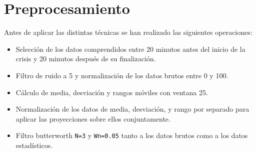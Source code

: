 \documentclass[a4paper,12pt,twoside,oldfontcommands]{memoir}
\begin{document}
\section{Preprocesamiento}
Antes de aplicar las distintas técnicas se han realizado las siguientes operaciones: 
\begin{itemize}
    \item Selección de los datos comprendidos entre 20 minutos antes del inicio de la crisis y 20 minutos después de su finalización. 
    \item Filtro de ruido a 5 y normalización de los datos brutos entre 0 y 100.
    \item Cálculo de media, desviación y rangos móviles con ventana 25. 
    \item Normalización de los datos de media, desviación, y rango por separado para aplicar las proyecciones sobre ellos conjuntamente. 
    \item Filtro butterworth \texttt{N=3} y \texttt{Wn=0.05} tanto a los datos brutos como a los datos estadísticos.  
\end{itemize}
\end{document}
